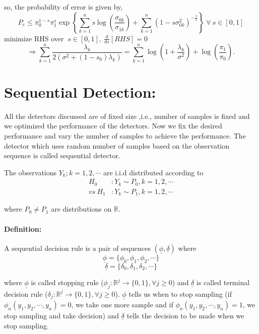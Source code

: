 \documentclass[12pt,a4paper]{article}
\newcommand{\uphi}{\underline{\phi}}
\newcommand{\udel}{\underline{\delta}}
\begin{document}
so, the probability of error is given by,
\begin{equation}
P_e \leq \pi_0^{1-s}\pi_1^{s}\exp\left\lbrace\sum_{k=1}^{n}s\log\left(\frac{\sigma_{0k}}{\sigma_{1k}} \right) + \sum_{k=1}^{n}\left( 1-s\sigma_{0k}^2\right)^{-\frac{1}{2}} \right\rbrace \;\forall \:s\in\left[ 0,1\right]
\end{equation}
minimize RHS over $\:s\in[0,1],\ \frac{d}{ds}[RHS]=0$
\begin{equation}
\Rightarrow\sum_{k=1}^{n}\frac{\lambda_k}{2\left(\sigma^{2} +(1-s_0)\lambda_k\right)}=\sum_{k=1}^{n}\log\left(1+\frac{\lambda_k}{\sigma^2} \right)+\log\left(\frac{\pi_1}{\pi_0} \right).
\end{equation}


\section{Sequential Detection:}

All the detectors discussed are of fixed size ,i.e., number of samples is fixed and we optimized the performance of the detectors. Now we fix the desired performance and vary the number of samples to achieve the performance. The detector which uses random number of samples based on the observation sequence is called sequential detector.

The observations ${Y_k;k=1,2,\cdots}$ are i.i.d distributed according to 
\begin{align*}
H_0 &: Y_k\sim P_0, k=1,2,\cdots\\
vs\ H_1 &: Y_k\sim {P}_1, k=1,2,\cdots
\end{align*}

where $P_0\neq P_1$ are distributions on $\mathbb{R}$.
\paragraph{Definition:}A sequential decision rule is a pair of sequences $(\uphi,\udel)$ where
$$\uphi=\{\phi_0,\phi_1,\phi_2,\cdots\}$$
$$\udel=\{\delta_0,\delta_1,\delta_2,\cdots\}$$ 

where $\uphi$ is called stopping rule ($\phi_j:\mathbb{R}^j \rightarrow \{0,1\}, \forall j\geq 0$) and $\udel$ is called terminal decision rule ($\delta_j:\mathbb{R}^j \rightarrow \{0,1\}, \forall j\geq 0$). $\uphi$ tells us when to stop sampling (if $\phi_n(y_1,y_2,\cdots,y_n)=0$, we take one more sample and if $\phi_n(y_1,y_2,\cdots,y_n)=1$, we stop sampling and take decision) and $\udel$ tells the decision to be made when we stop sampling.
\end{document}
